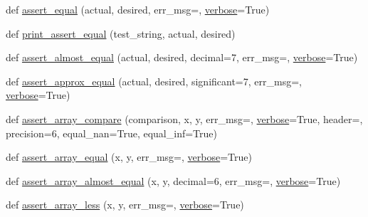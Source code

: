 \begin{DoxyCompactItemize}
\item 
def \hyperlink{namespacenumpy_1_1testing_1_1__private_1_1utils_a3dfd2c9aaf0d24a18ca8eae721df7a5d}{assert\+\_\+equal} (actual, desired, err\+\_\+msg=\textquotesingle{}\textquotesingle{}, \hyperlink{namespacenumpy_1_1testing_1_1__private_1_1utils_a4c0b8d13ca08494290635e712a0e8715}{verbose}=True)
\item 
def \hyperlink{namespacenumpy_1_1testing_1_1__private_1_1utils_a67fc795c17bd64636f114222ad32d9fa}{print\+\_\+assert\+\_\+equal} (test\+\_\+string, actual, desired)
\item 
def \hyperlink{namespacenumpy_1_1testing_1_1__private_1_1utils_a867e23ad224abf69d0af1a4685606540}{assert\+\_\+almost\+\_\+equal} (actual, desired, decimal=7, err\+\_\+msg=\textquotesingle{}\textquotesingle{}, \hyperlink{namespacenumpy_1_1testing_1_1__private_1_1utils_a4c0b8d13ca08494290635e712a0e8715}{verbose}=True)
\item 
def \hyperlink{namespacenumpy_1_1testing_1_1__private_1_1utils_a699b0a6a00ac32270a029fbd04bd64b0}{assert\+\_\+approx\+\_\+equal} (actual, desired, significant=7, err\+\_\+msg=\textquotesingle{}\textquotesingle{}, \hyperlink{namespacenumpy_1_1testing_1_1__private_1_1utils_a4c0b8d13ca08494290635e712a0e8715}{verbose}=True)
\item 
def \hyperlink{namespacenumpy_1_1testing_1_1__private_1_1utils_ad360ddc8afeaee54d5304a1bc510661c}{assert\+\_\+array\+\_\+compare} (comparison, x, y, err\+\_\+msg=\textquotesingle{}\textquotesingle{}, \hyperlink{namespacenumpy_1_1testing_1_1__private_1_1utils_a4c0b8d13ca08494290635e712a0e8715}{verbose}=True, header=\textquotesingle{}\textquotesingle{}, precision=6, equal\+\_\+nan=True, equal\+\_\+inf=True)
\item 
def \hyperlink{namespacenumpy_1_1testing_1_1__private_1_1utils_a45a8815f91dee1a9150d3b67764fd590}{assert\+\_\+array\+\_\+equal} (x, y, err\+\_\+msg=\textquotesingle{}\textquotesingle{}, \hyperlink{namespacenumpy_1_1testing_1_1__private_1_1utils_a4c0b8d13ca08494290635e712a0e8715}{verbose}=True)
\item 
def \hyperlink{namespacenumpy_1_1testing_1_1__private_1_1utils_ad2b735efdc64db6ce9e7307391947c91}{assert\+\_\+array\+\_\+almost\+\_\+equal} (x, y, decimal=6, err\+\_\+msg=\textquotesingle{}\textquotesingle{}, \hyperlink{namespacenumpy_1_1testing_1_1__private_1_1utils_a4c0b8d13ca08494290635e712a0e8715}{verbose}=True)
\item 
def \hyperlink{namespacenumpy_1_1testing_1_1__private_1_1utils_ab9c946b59ae78dcaa04a1d07f03571ca}{assert\+\_\+array\+\_\+less} (x, y, err\+\_\+msg=\textquotesingle{}\textquotesingle{}, \hyperlink{namespacenumpy_1_1testing_1_1__private_1_1utils_a4c0b8d13ca08494290635e712a0e8715}{verbose}=True)

\end{DoxyCompactItemize}
